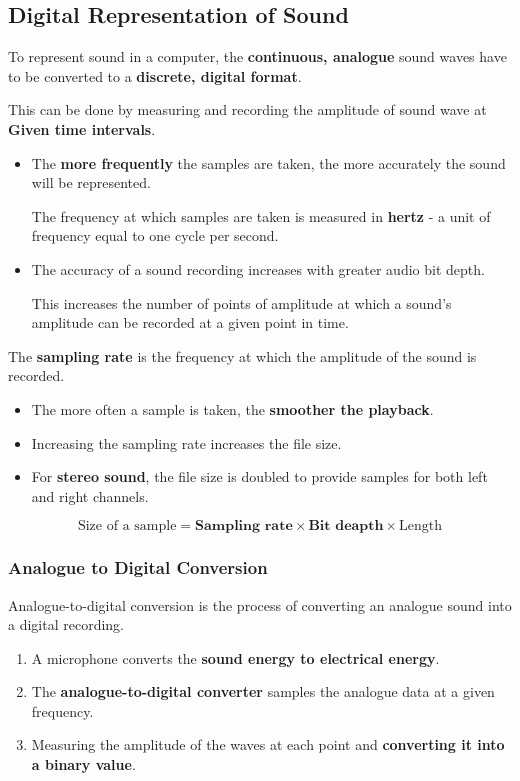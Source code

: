 \subsection{Digital Representation of Sound}

To represent sound in a computer, the \textbf{continuous, analogue} sound waves have to be converted to a \textbf{discrete, digital format}.

This can be done by measuring and recording the amplitude of sound wave at \textbf{Given time intervals}.
\begin{itemize}
    \item The \textbf{more frequently} the samples are taken, the more accurately the sound will be represented.

    The frequency at which samples are taken is measured in \textbf{hertz} - a unit of frequency equal to one cycle per second.
    \item The accuracy of a sound recording increases with greater audio bit depth.

        This increases the number of points of amplitude at which a sound's amplitude can be recorded at a given point in time.
\end{itemize}

The \textbf{sampling rate} is the frequency at which the amplitude of the sound is recorded.
\begin{itemize}
    \item The more often a sample is taken, the \textbf{smoother the playback}.
    \item Increasing the sampling rate increases the file size.
    \item For \textbf{stereo sound}, the file size is doubled to provide samples for both left and right channels.
\end{itemize}

$$\text{Size of a sample}=\textbf{Sampling rate}\times\textbf{Bit deapth}\times\text{Length}$$

\subsubsection*{Analogue to Digital Conversion}

Analogue-to-digital conversion is the process of converting an analogue sound into a digital recording.
\begin{enumerate}
    \item A microphone converts the \textbf{sound energy to electrical energy}.
    \item The \textbf{analogue-to-digital converter} samples the analogue data at a given frequency.
    \item Measuring the amplitude of the waves at each point and \textbf{converting it into a binary value}.
\end{enumerate}

